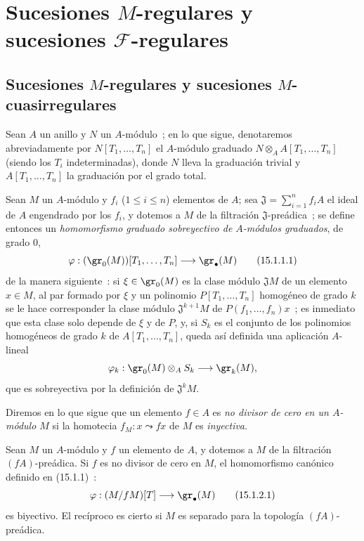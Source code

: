 \section{Sucesiones \texorpdfstring{$M$}{M}-regulares y sucesiones
\texorpdfstring{$\mathscr F$}{F}-regulares}
\label{section:0.15-es}

\subsection{Sucesiones \texorpdfstring{$M$}{M}-regulares y sucesiones
\texorpdfstring{$M$}{M}-cuasirregulares}
\label{subsection:0.15.1-es}
\label{0.15.1-es}

\begin{env}[15.1.1]
\label{0.15.1.1-es}
Sean $A$ un anillo y $N$ un $A$-módulo~; en lo que sigue, denotaremos
abreviadamente por $N[T_1,\ldots,T_n]$ el $A$-módulo graduado
$N\otimes_A A[T_1,\ldots,T_n]$ (siendo los $T_i$ indeterminadas), donde $N$
lleva la graduación trivial y $A[T_1,\ldots,T_n]$ la graduación por el grado total.

Sean $M$ un $A$-módulo y $f_i$ ($1\leq i\leq n$) elementos de $A$;
sea $\mathfrak{J}=\sum_{i=1}^n f_iA$ el ideal de $A$ engendrado por los $f_i$,
y dotemos a $M$ de la filtración $\mathfrak{J}$-preádica~; se define entonces un
\emph{homomorfismo graduado sobreyectivo de $A$-módulos graduados}, de grado $0$,
\[
  \varphi : (\gr_0(M))[T_1,\ldots,T_n]\longrightarrow\gr_\bullet(M)
  \tag{15.1.1.1}\label{0.15.1.1.1-es}
\]
de la manera siguiente~: si $\xi\in\gr_0(M)$ es la clase módulo
$\mathfrak{J}M$ de un elemento $x\in M$, al par formado por $\xi$ y un
polinomio $P[T_1,\ldots,T_n]$ homogéneo de grado $k$ se le hace corresponder la
clase módulo $\mathfrak{J}^{k+1}M$ de $P(f_1,\ldots,f_n)x$~; es inmediato
que esta clase
solo depende de $\xi$ y de $P$, y, si $S_k$ es el conjunto de los polinomios
homogéneos de grado $k$ de $A[T_1,\ldots,T_n]$, queda así definida una
aplicación $A$-lineal
\[
  \varphi_k:\gr_0(M)\otimes_A S_k\longrightarrow\gr_k(M),
\]
que es sobreyectiva por la definición de $\mathfrak{J}^kM$.

Diremos en lo que sigue que un elemento $f\in A$ es \emph{no divisor de
cero en un $A$-módulo $M$} si la homotecia $f_M:x\leadsto fx$ de $M$ es
\emph{inyectiva}.
\end{env}

\begin{lemma}[15.1.2]
\label{0.15.1.2-es}
Sean $M$ un $A$-módulo y $f$ un elemento de $A$, y dotemos a $M$ de la
filtración $(fA)$-preádica. Si $f$ es no divisor de cero en $M$,
el homomorfismo canónico definido en (15.1.1)~:
\[
  \varphi:(M/fM)[T]\longrightarrow\gr_\bullet(M)
  \tag{15.1.2.1}\label{0.15.1.2.1-es}
\]
es biyectivo. El recíproco es cierto si $M$ es separado para la topología
$(fA)$-preádica.
\end{lemma}

